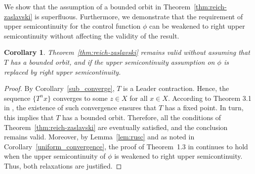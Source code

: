 \documentclass{birkjour}
\newtheorem{cor}[thm]{Corollary}
\theoremstyle{definition}
\theoremstyle{remark}
\numberwithin{equation}{section}
\begin{document}
We show that the assumption of a bounded orbit in Theorem~\ref{thm:reich-zaslavski} is superfluous. Furthermore, we demonstrate that the requirement of upper semicontinuity for the control function \(\phi\) can be weakened to right upper semicontinuity without affecting the validity of the result.

\begin{cor}
Theorem~\ref{thm:reich-zaslavski} remains valid without assuming that \(T\) has a bounded orbit, and if the upper semicontinuity assumption on \(\phi\) is replaced by right upper semicontinuity.
\end{cor}
\begin{proof}
By Corollary~\ref{sub_converge}, \(T\) is a Leader contraction. Hence, the sequence \(\{T^n x\}\) converges to some \(z \in X\) for all \(x \in X\). According to Theorem 3.1 in \cite{reich2008}, the existence of such convergence ensures that \(T\) has a fixed point. In turn, this implies that \(T\) has a bounded orbit. Therefore, all the conditions of Theorem~\ref{thm:reich-zaslavski} are eventually satisfied, and the conclusion remains valid.
Moreover, by Lemma~\ref{lem:rusc} and as noted in Corollary~\ref{uniform_convergence}, the proof of Theorem~1.3 in \cite{reich2008} continues to hold when the upper semicontinuity of \(\phi\) is weakened to right upper semicontinuity. Thus, both relaxations are justified.
\end{proof}
\end{document}
